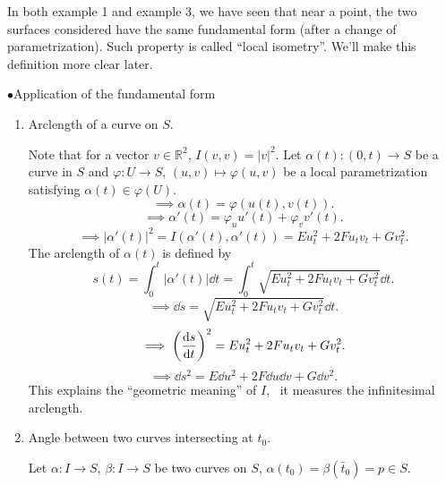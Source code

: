 \begin{remark}
    In both example 1 and example 3, we have seen that near a point, 
    the two surfaces considered have the same  
    fundamental form
     (after a change of parametrization). Such property is called
      ``local isometry''. We'll make this definition more clear later.
\end{remark}

\(\bullet\)Application of the  fundamental form

\begin{enumerate}[(1)]
    \item Arclength of a curve on \(S\).
    
    Note that for a vector \(v\in \mathbb{R}^2\), \(I(v,v)=|v|^2\).
    Let \(\alpha(t)\colon (0,t)\to S\) be a curve in \(S\) and 
    \(\varphi \colon U\to S\), \((u,v)\mapsto\varphi (u,v)\) be a 
    local parametrization satisfying 
    \(\alpha(t)\in \varphi(U)\).
    \[
    \implies \alpha(t)=\varphi\left(u(t),v(t)\right) .   
    \]
    \[
      \implies\alpha'(t)=\varphi_u u'(t)+\varphi_v v'(t) .
    \]
    \[\implies \left|\alpha'(t)\right|^2=
    I\left(\alpha'(t),\alpha'(t)\right)=E u_t^2+2F u_t v_t +G v_t^2.\]
    The arclength of \(\alpha(t)\) is defined by 
    \[
        s(t)=\int_0^t  \left|\alpha'(t)\right|\dd t
        =\int_0^t \sqrt{E u_t^2+2F u_t v_t +G v_t^2}\dd t  .
    \]
    \[
        \implies \dd s=\sqrt{E u_t^2+2F u_t v_t +G v_t^2}\dd t.
    \]
    \[
        \implies\left(\dv{s}{t}\right)^2=E u_t^2+2F u_t v_t +G v_t^2.
    \]
    \[
        \implies \dd s^2=E \dd u^2+2F \dd u \dd v +G \dd v^2    .
    \]
    This explains the ``geometric meaning'' of \(I\), \ie\ it measures 
    the infinitesimal arclength.
    \item Angle between two curves intersecting at \(t_0\).
    
    Let \(\alpha\colon I\to S\), \(\beta\colon I\to S\) be two curves 
    on \(S\), \(\alpha(t_0)=\beta(\bar{t}_0)=p\in S\). 
    \begin{center}
        



\begin{tikzpicture}[x=0.75pt,y=0.75pt,yscale=-1,xscale=1]


\end{tikzpicture}
\end{center}
\end{enumerate}
